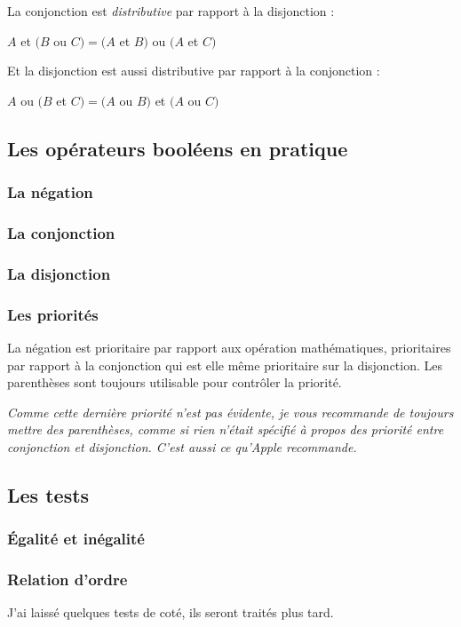La conjonction est \emph{distributive} par rapport à la disjonction :

$A$ et $(B$ ou $C) = (A$ et $B)$ ou $(A$ et $C)$

Et la disjonction est aussi distributive par rapport à la conjonction :

$A$ ou $(B$ et $C) = (A$ ou $B)$ et $(A$ ou $C)$

\subsection{Les opérateurs booléens en pratique}
\subsubsection{La négation}
\subsubsection{La conjonction}
\subsubsection{La disjonction}
\subsubsection{Les priorités}
La négation est prioritaire par rapport aux opération mathématiques, prioritaires par rapport à la conjonction qui est elle même prioritaire sur la disjonction. Les parenthèses sont toujours utilisable pour contrôler la priorité.

\emph{Comme cette dernière priorité n'est pas évidente, je vous recommande de toujours mettre des parenthèses, comme si rien n'était spécifié à propos des priorité entre conjonction et disjonction. C'est aussi ce qu'\emph{Apple} recommande.}
\subsection{Les tests}
\subsubsection{Égalité et inégalité}

\subsubsection{Relation d'ordre}

J'ai laissé quelques tests de coté, ils seront traités plus tard.
